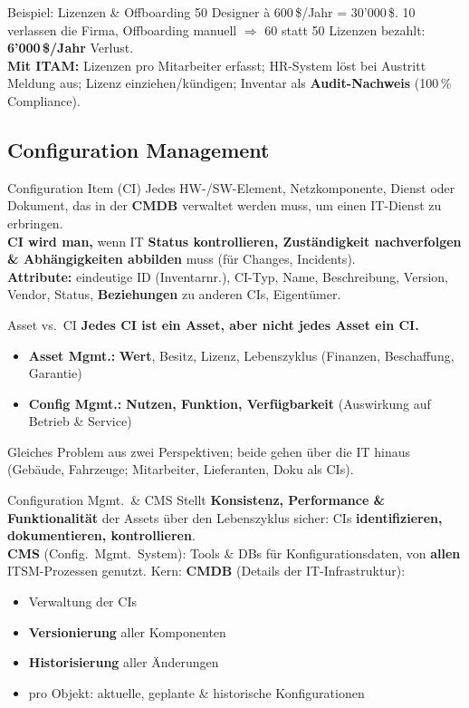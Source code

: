 \documentclass[a4paper, fontsize=7pt]{scrartcl}
\begin{document}
\begin{subbox}{Beispiel: Lizenzen \& Offboarding}
50 Designer à 600\,\$/Jahr = 30'000\,\$. 10 verlassen die Firma, Offboarding
manuell $\Rightarrow$ 60 statt 50 Lizenzen bezahlt: \textbf{6'000\,\$/Jahr}
Verlust.\\
\textbf{Mit ITAM:} Lizenzen pro Mitarbeiter erfasst; HR-System löst bei
Austritt Meldung aus; Lizenz einziehen/kündigen; Inventar als
\textbf{Audit-Nachweis} (100\,\% Compliance).
\end{subbox}

\subsection{Configuration Management}

\begin{mainbox}{Configuration Item (CI)}
Jedes HW-/SW-Element, Netzkomponente, Dienst oder Dokument, das in der
\textbf{CMDB} verwaltet werden muss, um einen IT-Dienst zu erbringen.\\
\textbf{CI wird man,} wenn IT \textbf{Status kontrollieren, Zuständigkeit
nachverfolgen \& Abhängigkeiten abbilden} muss (für Changes, Incidents).\\
\textbf{Attribute:} eindeutige ID (Inventarnr.), CI-Typ, Name, Beschreibung,
Version, Vendor, Status, \textbf{Beziehungen} zu anderen CIs, Eigentümer.
\end{mainbox}

\begin{mainbox}{Asset vs.\ CI}
\textbf{Jedes CI ist ein Asset, aber nicht jedes Asset ein CI.}
\begin{itemize}
    \item \textbf{Asset Mgmt.:} \textbf{Wert}, Besitz, Lizenz, Lebenszyklus
          (Finanzen, Beschaffung, Garantie)
    \item \textbf{Config Mgmt.:} \textbf{Nutzen, Funktion, Verfügbarkeit}
          (Auswirkung auf Betrieb \& Service)
\end{itemize}
Gleiches Problem aus zwei Perspektiven; beide gehen über die IT hinaus
(Gebäude, Fahrzeuge; Mitarbeiter, Lieferanten, Doku als CIs).
\end{mainbox}

\begin{mainbox}{Configuration Mgmt.\ \& CMS}
Stellt \textbf{Konsistenz, Performance \& Funktionalität} der Assets über den
Lebenszyklus sicher: CIs \textbf{identifizieren, dokumentieren,
kontrollieren}.\\
\textbf{CMS} (Config.\ Mgmt.\ System): Tools \& DBs für Konfigurationsdaten,
von \textbf{allen} ITSM-Prozessen genutzt. Kern: \textbf{CMDB}
(Details der IT-Infrastruktur):
\begin{itemize}
    \item Verwaltung der CIs
    \item \textbf{Versionierung} aller Komponenten
    \item \textbf{Historisierung} aller Änderungen
    \item pro Objekt: aktuelle, geplante \& historische Konfigurationen
\end{itemize}
\end{mainbox}
\end{document}
